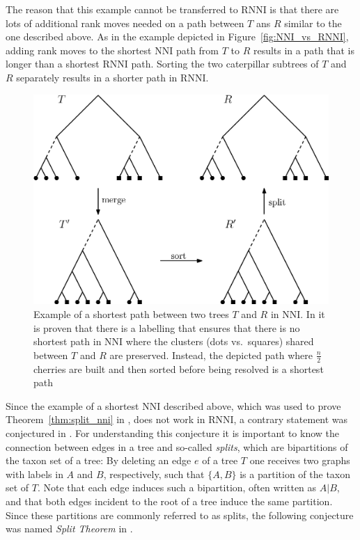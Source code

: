 \documentclass{amsart}
\newcommand{\nni}{\mathrm{NNI}}
\newcommand{\rnni}{\mathrm{RNNI}}
\begin{document}
The reason that this example cannot be transferred to $\rnni$ is that there are lots of additional rank moves needed on a path between $T$ ans $R$ similar to the one described above.
As in the example depicted in Figure~\ref{fig:NNI_vs_RNNI}, adding rank moves to the shortest $\nni$ path from $T$ to $R$ results in a path that is longer than a shortest $\rnni$ path.
Sorting the two caterpillar subtrees of $T$ and $R$ separately results in a shorter path in $\rnni$.

\begin{figure}[H]
\centering
\includegraphics[width=.8\textwidth]{NNI_NP_proof}
\vspace{12pt}
\caption{Example of a shortest path between two trees $T$ and $R$ in $\nni$.
In \autocite{Li1996-zw} it is proven that there is a labelling that ensures that there is no shortest path in $\nni$ where the clusters (dots vs.\ squares) shared between $T$ and $R$ are preserved.
Instead, the depicted path where $\frac{n}{2}$ cherries are built and then sorted before being resolved is a shortest path}
\label{fig:NNI_NP_proof}
\end{figure}

Since the example of a shortest $\nni$ described above, which was used to prove Theorem~\ref{thm:split_nni} in \autocite{Li1996-zw}, does not work in $\rnni$, a contrary statement was conjectured in \autocite{Gavryushkin2018-ol}.
For understanding this conjecture it is important to know the connection between edges in a tree and so-called \emph{splits}, which are bipartitions of the taxon set of a tree:
By deleting an edge $e$ of a tree $T$ one receives two graphs with labels in $A$ and $B$, respectively, such that $\{A,B\}$ is a partition of the taxon set of $T$.
Note that each edge induces such a bipartition, often written as $A|B$, and that both edges incident to the root of a tree induce the same partition.
Since these partitions are commonly referred to as splits, the following conjecture was named \emph{Split Theorem} in \autocite{Gavryushkin2018-ol}.
\end{document}
